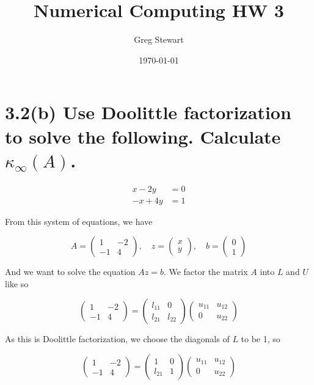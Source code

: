 \documentclass{article}
\title{Numerical Computing HW 3}
\author{Greg Stewart}
\date{\today}
\begin{document}
\maketitle

\section*{3.2(b) \normalsize Use Doolittle factorization to solve the following. Calculate $\kappa_{\infty}(A)$.}

\begin{align*}
  x -2y &= 0 \\ -x + 4y &= 1
\end{align*}

From this system of equations, we have

$$
A =
\begin{pmatrix}
  1 & -2 \\ -1 & 4 
\end{pmatrix}
,\quad
z =
\begin{pmatrix} x \\ y \end{pmatrix}
,\quad
b =
\begin{pmatrix} 0 \\ 1 \end{pmatrix}
$$

And we want to solve the equation $Az = b$. We factor the matrix $A$ into $L$ and $U$ like so

$$
\begin{pmatrix} 1 & -2 \\ -1 & 4 \end{pmatrix}
=
\begin{pmatrix} l_{11} & 0 \\ l_{21} & l_{22} \end{pmatrix}
\begin{pmatrix} u_{11} & u_{12} \\  0 & u_{22} \end{pmatrix}
$$

As this is Doolittle factorization, we choose the diagonals of $L$ to be 1, so

$$
\begin{pmatrix} 1 & -2 \\ -1 & 4 \end{pmatrix}
=
\begin{pmatrix} 1 & 0 \\ l_{21} & 1 \end{pmatrix}
  \begin{pmatrix} u_{11} & u_{12} \\ 0 &  u_{22} \end{pmatrix}
$$
\end{document}
